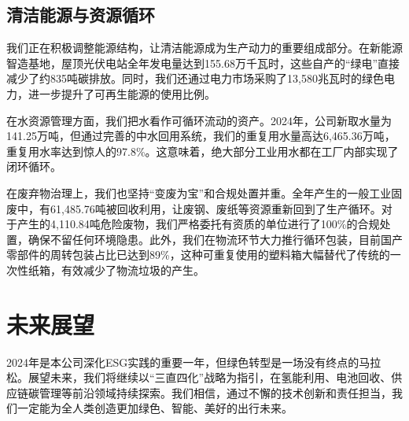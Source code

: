 \documentclass[a4paper,12pt]{article}
\begin{document}
\subsection{清洁能源与资源循环}

我们正在积极调整能源结构，让清洁能源成为生产动力的重要组成部分。在新能源智造基地，屋顶光伏电站全年发电量达到155.68万千瓦时，这些自产的“绿电”直接减少了约835吨碳排放。同时，我们还通过电力市场采购了13,580兆瓦时的绿色电力，进一步提升了可再生能源的使用比例。

在水资源管理方面，我们把水看作可循环流动的资产。2024年，公司新取水量为141.25万吨，但通过完善的中水回用系统，我们的重复用水量高达6,465.36万吨，重复用水率达到惊人的97.8\%。这意味着，绝大部分工业用水都在工厂内部实现了闭环循环。

在废弃物治理上，我们也坚持“变废为宝”和合规处置并重。全年产生的一般工业固废中，有61,485.76吨被回收利用，让废钢、废纸等资源重新回到了生产循环。对于产生的4,110.84吨危险废物，我们严格委托有资质的单位进行了100\%的合规处置，确保不留任何环境隐患。此外，我们在物流环节大力推行循环包装，目前国产零部件的周转包装占比已达到89\%，这种可重复使用的塑料箱大幅替代了传统的一次性纸箱，有效减少了物流垃圾的产生。

\section{未来展望}

2024年是本公司深化ESG实践的重要一年，但绿色转型是一场没有终点的马拉松。展望未来，我们将继续以“三直四化”战略为指引，在氢能利用、电池回收、供应链碳管理等前沿领域持续探索。我们相信，通过不懈的技术创新和责任担当，我们一定能为全人类创造更加绿色、智能、美好的出行未来。

\vspace{2cm}
\end{document}
